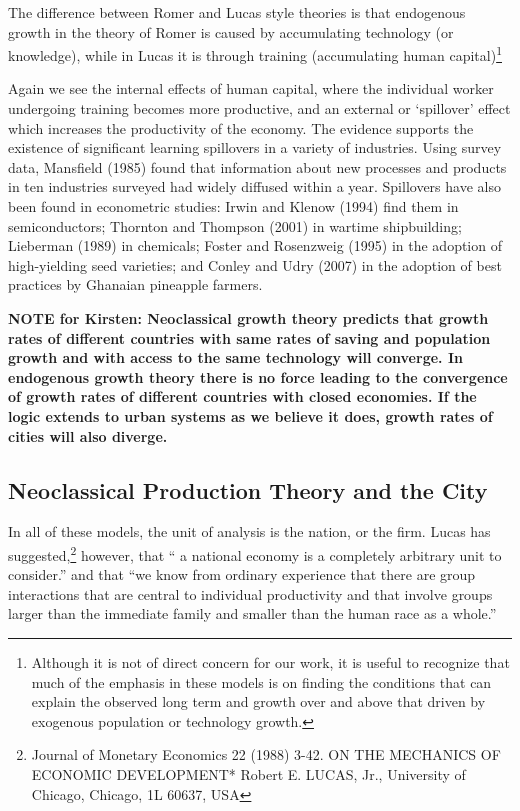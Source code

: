 The difference between Romer and Lucas style theories is that endogenous growth in the theory of Romer is caused by accumulating technology (or knowledge), while in Lucas it is through training (accumulating human capital)\footnote{Although it is not of direct concern for our work, it is useful to recognize that much of the emphasis in these models is on finding the conditions that can explain the observed long term  and growth over and above that driven by exogenous population or technology growth. }


Again we see the  internal effects of human capital, where the individual worker undergoing training becomes more productive, and an external or `spillover' effect which increases the productivity of the economy. 
The evidence supports the existence of significant learning spillovers in a variety of industries. Using survey data, Mansfield (1985) found that information about new processes and products in ten industries surveyed had widely diffused within a year. Spillovers have also been found in econometric studies: Irwin and Klenow (1994) find them in semiconductors; Thornton and Thompson (2001) in wartime shipbuilding; Lieberman (1989) in chemicals; Foster and Rosenzweig (1995) in the adoption of high-yielding seed varieties; and Conley and Udry (2007) in the adoption of best practices by Ghanaian pineapple farmers. 

\textbf{ NOTE for Kirsten:  Neoclassical  growth theory predicts that growth rates of different countries with same rates of saving and population growth and with access to the same technology will converge. In  endogenous growth theory there is no force leading to the convergence of growth rates of different countries with closed economies. If the logic extends to urban systems as we believe it does, growth rates of cities will also diverge.}

\subsection{Neoclassical Production Theory and the City}

In all of these models, the unit of analysis is the nation,  or the firm. Lucas has suggested,\footnote{Journal of Monetary Economics 22 (1988) 3-42.  ON THE MECHANICS OF ECONOMIC DEVELOPMENT*
Robert E. LUCAS, Jr., University of Chicago, Chicago, 1L 60637, USA}
however, that `` a national economy is a completely arbitrary unit to consider.'' and that ``we know from ordinary experience that there are group interactions that are central to individual productivity and that involve groups larger than the immediate family and smaller than the human race as a whole.''  



